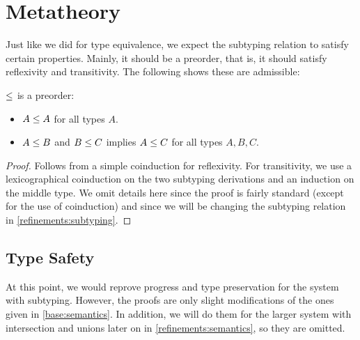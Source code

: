 
\section{Metatheory}

Just like we did for type equivalence, we expect the subtyping relation to satisfy certain properties. Mainly, it should be a preorder, that is, it should satisfy reflexivity and transitivity. The following  shows these are admissible:

\begin{theorem}
  \label{base:sub-is-preorder}
  $\le$ is a preorder:
  \begin{itemize}
    \item $A \le A$ for all types $A$.
    \item $A \le B$ and $B \le C$ implies $A \le C$ for all types $A, B, C$.
  \end{itemize}
\end{theorem}
\begin{proof}
  Follows from a simple coinduction for reflexivity. For transitivity, we use a lexicographical coinduction on the two subtyping derivations and an induction on the middle type. We omit details here since the proof is fairly standard (except for the use of coinduction) and since we will be changing the subtyping relation in \cref{refinements:subtyping}.
\end{proof}


\subsection{Type Safety}

At this point, we would reprove progress and type preservation for the system with subtyping. However, the proofs are only slight modifications of the ones given in \cref{base:semantics}. In addition, we will do them for the larger system with intersection and unions later on in \cref{refinements:semantics}, so they are omitted.

